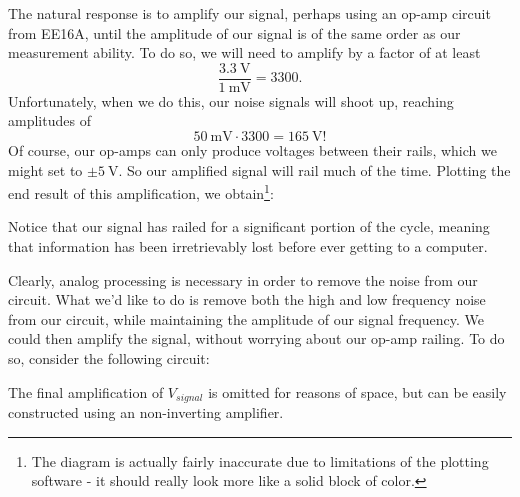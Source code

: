 \documentclass[letterpaper]{article}
\theoremstyle{remark}
\begin{document}
The natural response is to amplify our signal, perhaps using an op-amp circuit from EE16A, until the amplitude of our signal is of the same order as our measurement ability. To do so, we will need to amplify by a factor of at least
\[
    \frac{\SI{3.3}{\volt}}{\SI{1}{\milli\volt}} = 3300.
\]
Unfortunately, when we do this, our noise signals will shoot up, reaching amplitudes of
\[
    \SI{50}{\milli\volt} \cdot 3300 = \SI{165}{\volt}!
\]
Of course, our op-amps can only produce voltages between their rails, which we might set to $\pm \SI{5}{\volt}$. So our amplified signal will rail much of the time. Plotting the end result of this amplification, we obtain\footnote{The diagram is actually fairly inaccurate due to limitations of the plotting software - it should really look more like a solid block of color.}:
\begin{center}
\end{center}
Notice that our signal has railed for a significant portion of the cycle, meaning that information has been irretrievably lost before ever getting to a computer.

Clearly, analog processing is necessary in order to remove the noise from our circuit. What we'd like to do is remove both the high and low frequency noise from our circuit, while maintaining the amplitude of our signal frequency. We could then amplify the signal, without worrying about our op-amp railing. To do so, consider the following circuit:

\noindent{}
The final amplification of $V_{signal}$ is omitted for reasons of space, but can be easily constructed using an non-inverting amplifier.
\end{document}
